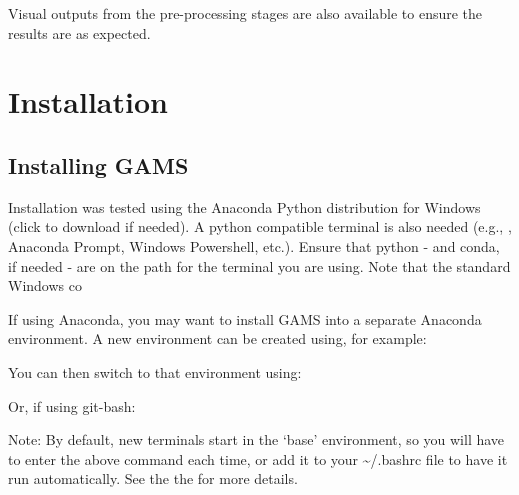\documentclass[letterpaper,10pt,english,openany,oneside]{sphinxmanual}
\begin{document}
Visual outputs from the pre-processing stages are also available to ensure the results are as expected.


\section{Installation}
\label{\detokenize{index:installation}}

\subsection{Installing GAMS}
\label{\detokenize{content/getting_started/installation:installing-gams}}\label{\detokenize{content/getting_started/installation:installation}}\label{\detokenize{content/getting_started/installation::doc}}
Installation was tested using the Anaconda Python distribution for Windows (click  to download if needed). A python compatible terminal is also needed (e.g., , Anaconda Prompt, Windows Powershell, etc.). Ensure that python - and conda, if needed - are on the path for the terminal you are using. Note that the standard Windows co

If using Anaconda, you may want to install GAMS into a separate Anaconda environment. A new environment can be created using, for example:

\begin{sphinxVerbatim}[commandchars=\\\{\}]
     
\end{sphinxVerbatim}

\newpage

You can then switch to that environment using:

\begin{sphinxVerbatim}[commandchars=\\\{\}]
  
\end{sphinxVerbatim}

Or, if using git-bash:

\begin{sphinxVerbatim}[commandchars=\\\{\}]
  
\end{sphinxVerbatim}

Note: By default, new terminals start in the ‘base’ environment, so you will have to enter the above command each time, or add it to your \textasciitilde{}/.bashrc file to have it run automatically. See the the  for more details.
\end{document}
